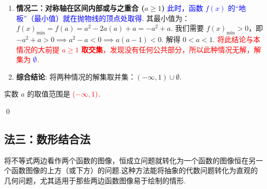 \begin{solution}
\begin{enumerate}
		\item \textbf{情况二：对称轴在区间内部或与之重合 ($a \ge 1$)}
		\textcolor{blue}{此时，函数 $f(x)$ 的“地板”（最小值）就在抛物线的顶点处取得.}
		其最小值为：$f(x)_{\min} = f(a) = a^2 - 2a(a) + a = -a^2+a$.
		我们需要 $f(x)_{\min} > 0$，即 $-a^2+a > 0 \implies a^2-a < 0 \implies a(a-1) < 0$.
		解得 $0 < a < 1$.
		\textcolor{red}{将此结论与本情况的大前提 $a \ge 1$ \textbf{取交集}，发现没有任何公共部分，所以此种情况无解，解集为 $\textcolor{blue}{\emptyset}$.}
		
		\item \textbf{综合结论}:
		将两种情况的解集取并集：$(-\infty, 1) \cup \emptyset$.
	\end{enumerate}
	实数 $a$ 的取值范围是 $\textcolor{red}{(-\infty, 1)}$.
\end{solution}
\qed

\subsection{法三：数形结合法}

\begin{definition}[数形结合法]
	将不等式两边看作两个函数的图像，恒成立问题就转化为一个函数的图像恒在另一个函数图像的上方（或下方）的问题.这种方法能将抽象的代数问题转化为直观的几何问题，尤其适用于那些两边函数图像易于绘制的情形.
\end{definition}

